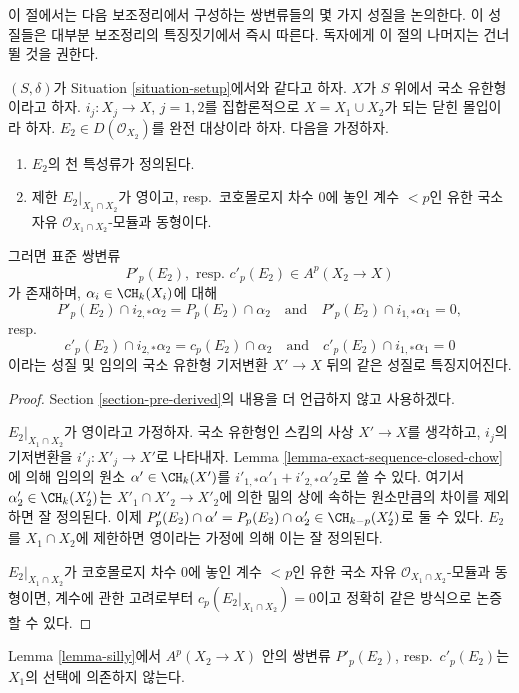 \noindent
이 절에서는 다음 보조정리에서 구성하는 쌍변류들의 몇 가지 성질을
논의한다. 이 성질들은 대부분 보조정리의 특징짓기에서 즉시 따른다.
독자에게 이 절의 나머지는 건너뛸 것을 권한다.

\begin{lemma}
\label{lemma-silly}
$(S, \delta)$가 Situation \ref{situation-setup}에서와 같다고 하자.
$X$가 $S$ 위에서 국소 유한형이라고 하자.
$i_j : X_j \to X$, $j = 1, 2$를 집합론적으로
$X = X_1 \cup X_2$가 되는 닫힌 몰입이라 하자.
$E_2 \in D(\mathcal{O}_{X_2})$를 완전 대상이라 하자. 다음을 가정하자.
\begin{enumerate}
\item $E_2$의 천 특성류가 정의된다.
\item 제한 $E_2|_{X_1 \cap X_2}$가 영이고, resp.\ 코호몰로지 차수
$0$에 놓인 계수 $< p$인 유한 국소 자유
$\mathcal{O}_{X_1 \cap X_2}$-모듈과 동형이다.
\end{enumerate}
그러면 표준 쌍변류
$$
P'_p(E_2),\text{ resp. }c'_p(E_2) \in A^p(X_2 \to X)
$$
가 존재하며, $\alpha_i \in \CH_k(X_i)$에 대해
$$
P'_p(E_2) \cap i_{2, *} \alpha_2 = P_p(E_2) \cap \alpha_2
\quad\text{and}\quad
P'_p(E_2) \cap i_{1, *} \alpha_1 = 0,
$$
resp.\
$$
c'_p(E_2) \cap i_{2, *} \alpha_2 = c_p(E_2) \cap \alpha_2
\quad\text{and}\quad
c'_p(E_2) \cap i_{1, *} \alpha_1 = 0
$$
이라는 성질 및 임의의 국소 유한형 기저변환 $X' \to X$ 뒤의 같은
성질로 특징지어진다.
\end{lemma}

\begin{proof}
Section \ref{section-pre-derived}의 내용을 더 언급하지 않고 사용하겠다.

\medskip\noindent
$E_2|_{X_1 \cap X_2}$가 영이라고 가정하자. 국소 유한형인 스킴의 사상
$X' \to X$를 생각하고, $i_j$의 기저변환을
$i'_j : X'_j \to X'$로 나타내자. Lemma
\ref{lemma-exact-sequence-closed-chow}에 의해 임의의 원소
$\alpha' \in \CH_k(X')$를
$i'_{1, *}\alpha'_1 + i'_{2, *}\alpha'_2$로 쓸 수 있다. 여기서
$\alpha'_2 \in \CH_k(X'_2)$는 $X'_1 \cap X'_2 \to X'_2$에 의한
밂의 상에 속하는 원소만큼의 차이를 제외하면 잘 정의된다. 이제
$P'_p(E_2) \cap \alpha' = P_p(E_2) \cap \alpha'_2 \in \CH_{k - p}(X'_2)$로
둘 수 있다. $E_2$를 $X_1 \cap X_2$에 제한하면 영이라는 가정에 의해
이는 잘 정의된다.

\medskip\noindent
$E_2|_{X_1 \cap X_2}$가 코호몰로지 차수 $0$에 놓인 계수 $< p$인
유한 국소 자유 $\mathcal{O}_{X_1 \cap X_2}$-모듈과 동형이면,
계수에 관한 고려로부터 $c_p(E_2|_{X_1 \cap X_2}) = 0$이고 정확히
같은 방식으로 논증할 수 있다.
\end{proof}
\begin{lemma}
\label{lemma-silly-independent}
Lemma \ref{lemma-silly}에서 $A^p(X_2 \to X)$ 안의 쌍변류
$P'_p(E_2)$, resp.\ $c'_p(E_2)$는 $X_1$의 선택에 의존하지 않는다.
\end{lemma}

